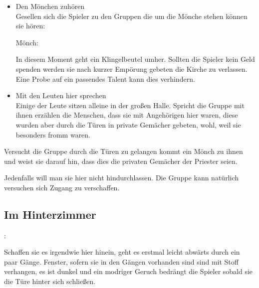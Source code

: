 \begin{itemize}
  \item Den Mönchen zuhören \\
  Gesellen sich die Spieler zu den Gruppen die um die Mönche stehen können sie hören:

  Mönch: 

  In diesem Moment geht ein Klingelbeutel umher. Sollten die Spieler kein Geld spenden werden sie nach kurzer Empörung gebeten die Kirche zu verlassen. Eine Probe auf ein passendes Talent kann dies verhindern.

  \item Mit den Leuten hier sprechen \\
  Einige der Leute sitzen alleine in der großen Halle. Spricht die Gruppe mit ihnen erzählen die Menschen, dass sie mit Angehörigen hier waren, diese wurden aber durch die Türen in private Gemächer gebeten, wohl, weil sie besonders fromm waren.
\end{itemize}

Versucht die Gruppe durch die Türen zu gelangen kommt ein Mönch zu ihnen und weist sie darauf hin, dass dies die privaten Gemächer der Priester seien.


Jedenfalls will man sie hier nicht hindurchlassen. Die Gruppe kann natürlich versuchen sich Zugang zu verschaffen.

\subsection*{Im Hinterzimmer}
\label{hinten}

:

Schaffen sie es irgendwie hier hinein, geht es erstmal leicht abwärts durch ein paar Gänge. Fenster, sofern sie in den Gängen vorhanden sind sind mit Stoff verhangen, es ist dunkel und ein modriger Geruch bedrängt die Spieler sobald sie die Türe hinter sich schließen.

